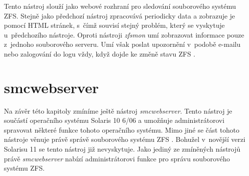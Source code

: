Tento nástroj slouží jako webové rozhraní pro sledování souborového systému ZFS. Stejně jako předchozí nástroj zpracovává periodicky data a zobrazuje je pomocí HTML stránek, s~čímž souvisí stejný problém, který se vyskytuje u~předchozího nástroje. Oproti nástroji \emph{zfsmon} umí zobrazovat informace pouze z~jednoho souborového serveru. Umí však poslat upozornění v~podobě e-mailu nebo zalogování do logu vždy, když dojde ke změně stavu ZFS \cite{zfswatcher}.
\section{smcwebserver}
Na závěr této kapitoly zmíníme ještě nástroj \emph{smcwebserver}. Tento nástroj je součástí operačního systému Solaris 10 6/06 a umožňuje administrátorovi spravovat některé funkce tohoto operačního systému. Mimo jiné se část tohoto nástroje věnuje právě správě souborového systému ZFS \cite{smc}. Bohužel v~novější verzi Solarisu 11 se tento nástroj již nevyskytuje. Jako jediný ze zmíněných nástrojů právě \emph{smcwebserver} nabízí administrátorovi funkce pro správu souborového systému ZFS. 